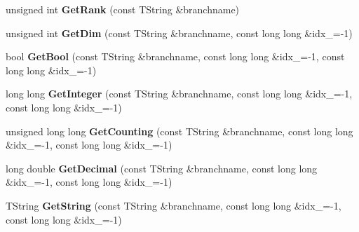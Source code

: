\begin{DoxyCompactItemize}
\item 
\hypertarget{class_h_a_l_1_1_analysis_tree_reader_aa4dae5db1c660155760ded68007cdd6d}{unsigned int {\bfseries Get\+Rank} (const T\+String \&branchname)}\label{class_h_a_l_1_1_analysis_tree_reader_aa4dae5db1c660155760ded68007cdd6d}

\item 
\hypertarget{class_h_a_l_1_1_analysis_tree_reader_a1a8c741c6b2ae788b98d596c12543724}{unsigned int {\bfseries Get\+Dim} (const T\+String \&branchname, const long long \&idx\+\_=-\/1)}\label{class_h_a_l_1_1_analysis_tree_reader_a1a8c741c6b2ae788b98d596c12543724}

\item 
\hypertarget{class_h_a_l_1_1_analysis_tree_reader_a8a76466f4746d4764b0fa97416182267}{bool {\bfseries Get\+Bool} (const T\+String \&branchname, const long long \&idx\+\_=-\/1, const long long \&idx\+\_=-\/1)}\label{class_h_a_l_1_1_analysis_tree_reader_a8a76466f4746d4764b0fa97416182267}

\item 
\hypertarget{class_h_a_l_1_1_analysis_tree_reader_a6b2e01f1075ed295513a268258d3d559}{long long {\bfseries Get\+Integer} (const T\+String \&branchname, const long long \&idx\+\_=-\/1, const long long \&idx\+\_=-\/1)}\label{class_h_a_l_1_1_analysis_tree_reader_a6b2e01f1075ed295513a268258d3d559}

\item 
\hypertarget{class_h_a_l_1_1_analysis_tree_reader_aa4d264484021ba0912f6254aeacc784f}{unsigned long long {\bfseries Get\+Counting} (const T\+String \&branchname, const long long \&idx\+\_=-\/1, const long long \&idx\+\_=-\/1)}\label{class_h_a_l_1_1_analysis_tree_reader_aa4d264484021ba0912f6254aeacc784f}

\item 
\hypertarget{class_h_a_l_1_1_analysis_tree_reader_a4a3dd2065768228ab817575307c4691e}{long double {\bfseries Get\+Decimal} (const T\+String \&branchname, const long long \&idx\+\_=-\/1, const long long \&idx\+\_=-\/1)}\label{class_h_a_l_1_1_analysis_tree_reader_a4a3dd2065768228ab817575307c4691e}

\item 
\hypertarget{class_h_a_l_1_1_analysis_tree_reader_a75c0fe7d907ac8f1792ff496e4cf0b73}{T\+String {\bfseries Get\+String} (const T\+String \&branchname, const long long \&idx\+\_=-\/1, const long long \&idx\+\_=-\/1)}\label{class_h_a_l_1_1_analysis_tree_reader_a75c0fe7d907ac8f1792ff496e4cf0b73}


\end{DoxyCompactItemize}
